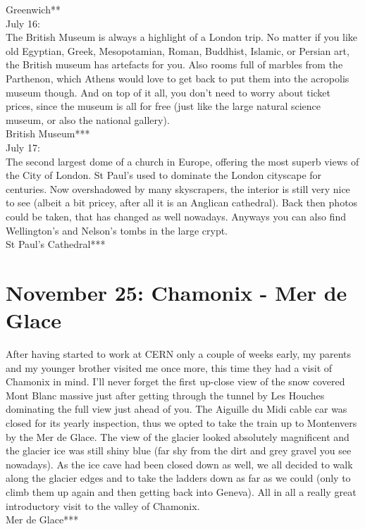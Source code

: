 Greenwich**\\

July 16:\\
The British Museum is always a highlight of a London trip. No matter if you like old Egyptian, Greek, Mesopotamian, Roman, Buddhist, Islamic, or Persian art, the British museum has artefacts for you. Also rooms full of marbles from the Parthenon, which Athens would love to get back to put them into the acropolis museum though. And on top of it all, you don't need to worry about ticket prices, since the museum is all for free (just like the large natural science museum, or also the national gallery).\\

British Museum***\\

July 17:\\
The second largest dome of a church in Europe, offering the most superb views of the City of London. St Paul's used to dominate the London cityscape for centuries. Now overshadowed by many skyscrapers, the interior is still very nice to see (albeit a bit pricey, after all it is an Anglican cathedral). Back then photos could be taken, that has changed as well nowadays. Anyways you can also find Wellington's and Nelson's tombs in the large crypt.\\

St Paul's Cathedral***

\section{November 25: Chamonix - Mer de Glace}
\label{2006:Chamonix}

After having started to work at CERN only a couple of weeks early, my parents and my younger brother visited me once more, this time they had a visit of Chamonix in mind. I'll never forget the first up-close view of the snow covered Mont Blanc massive just after getting through the tunnel by Les Houches dominating the full view just ahead of you. The Aiguille du Midi cable car was closed for its yearly inspection, thus we opted to take the train up to Montenvers by the Mer de Glace. The view of the glacier looked absolutely magnificent and the glacier ice was still shiny blue (far shy from the dirt and grey gravel you see nowadays). As the ice cave had been closed down as well, we all decided to walk along the glacier edges and to take the ladders down as far as we could (only to climb them up again and then getting back into Geneva). All in all a really great introductory visit to the valley of Chamonix.\\

Mer de Glace***\\